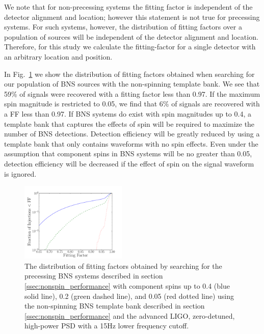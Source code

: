 We note that for non-precessing systems
the fitting factor is independent of the detector alignment and location; however
this statement is not true for precessing systems. For such systems, however,
the distribution of fitting factors over
a population of sources will be independent of the detector alignment
and location. Therefore, for this study we calculate the fitting-factor for a single
detector with an arbitrary location and position.


In Fig.~\ref{fig:no_spin_cover} we show the distribution of fitting factors
obtained when searching for our population of BNS sources with the
non-spinning template bank. We see that 59\% of signals were recovered with a
fitting factor less than 0.97.  If the maximum spin magnitude is restricted to
0.05, we find that 6\% of signals are recovered with a FF less
than 0.97.  If BNS systems do exist with spin magnitudes up to 0.4, a template
bank that captures the effects of spin will be required to maximize the number
of BNS detections.  Detection efficiency will be greatly reduced by using a
template bank that only contains waveforms with no spin effects.  Even under
the assumption that component spins in BNS systems will be no greater
than 0.05, detection efficiency will be decreased if the effect of spin on the
signal waveform is ignored.

\begin{figure}
\includegraphics[width=0.45\textwidth]{papers/bns_spin/figure1.pdf}
\caption{\label{fig:no_spin_cover} The distribution of fitting factors obtained by searching
for the precessing BNS systems described in section \ref{ssec:nonspin_performance}
with component spins up to 0.4 (blue solid line), 0.2 (green dashed line), and 0.05 (red dotted line) using the non-spinning
BNS template bank described in section \ref{ssec:nonspin_performance} and the advanced LIGO, zero-detuned,
high-power PSD with a 15Hz lower frequency cutoff.}
\end{figure}

